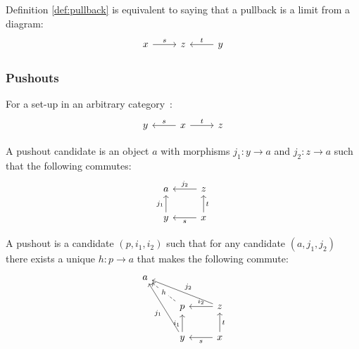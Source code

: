 \begin{definition}
  Definition \ref{def:pullback} is equivalent to saying that a pullback is a
  limit from a diagram:
  \[\begin{tikzcd}[ampersand replacement=\&]
    x \& z \& y
    \arrow["t"', from=1-3, to=1-2]
    \arrow["s", from=1-1, to=1-2]
  \end{tikzcd}\]
\end{definition}

\subsubsection*{Pushouts}

\begin{definition}
  For a set-up in an arbitrary
  category~\parencite[p.~130]{leinster:basic_category_theory}:
  \[\begin{tikzcd}[ampersand replacement=\&]
    y \& x \& z
    \arrow["t", from=1-2, to=1-3]
    \arrow["s"', from=1-2, to=1-1]
  \end{tikzcd}\]

  A pushout candidate is an object $a$ with morphisms $j_1: y \to a$ and $j_2:
  z\to a$ such that the following commutes:
  \[\begin{tikzcd}[ampersand replacement=\&]
    a \& z \\
    y \& x
    \arrow["t"', from=2-2, to=1-2]
    \arrow["s", from=2-2, to=2-1]
    \arrow["{j_1}", from=2-1, to=1-1]
    \arrow["{j_2}"', from=1-2, to=1-1]
  \end{tikzcd}\]

  A pushout is a candidate $(p, i_1, i_2)$ such that for any candidate $(a,
  j_1, j_2)$ there exists a unique $h:p\to a$ that makes the following
  commute:
  \[\begin{tikzcd}[ampersand replacement=\&]
    a \\
    \& p \& z \\
    \& y \& x
    \arrow["t"', from=3-3, to=2-3]
    \arrow["s", from=3-3, to=3-2]
    \arrow["{i_1}", from=3-2, to=2-2]
    \arrow["{i_2}"', from=2-3, to=2-2]
    \arrow["h"{description}, dashed, from=2-2, to=1-1]
    \arrow["{j_1}", from=3-2, to=1-1]
    \arrow["{j_2}"', from=2-3, to=1-1]
  \end{tikzcd}\]
\end{definition}

